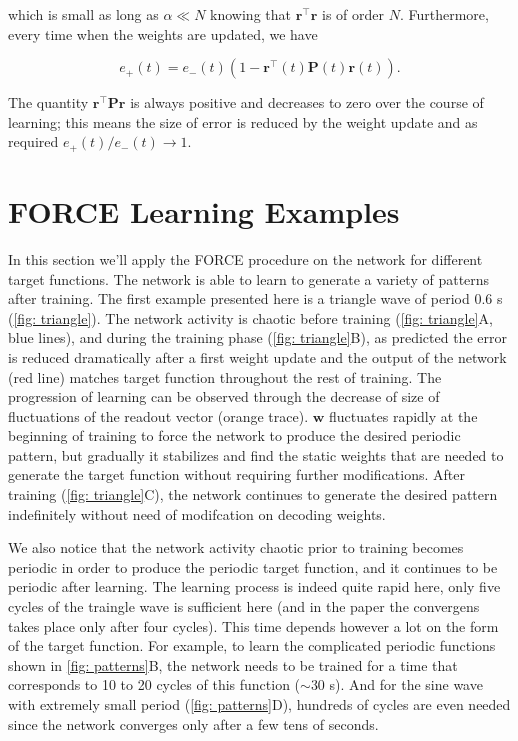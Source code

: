 \noindent
which is small as long as $\alpha \ll N$ knowing that 
$\mathbf{r}^{\top}\mathbf{r}$ is of order $N$. Furthermore, every time
when the weights are updated, we have

\[e_+(t) = e_-(t)(1-\mathbf{r}^{\top}(t)\mathbf{P}(t)\mathbf{r}(t)).\]

\noindent
The quantity $\mathbf{r}^{\top}\mathbf{Pr}$ is always positive and
decreases to zero over the course of learning; this means the size of 
error is reduced by the weight update and as required 
$e_+(t)/e_-(t) \rightarrow 1$.


\section{FORCE Learning Examples}

In this section we'll apply the FORCE procedure on the network for different
target functions. The network is able to learn to generate a variety of
patterns after training. The first example presented here is a 
triangle wave of period 0.6 s (\autoref{fig: triangle}). 
The network activity is chaotic before training 
(\autoref{fig: triangle}A, blue lines), and 
during the training phase (\autoref{fig: triangle}B), 
as predicted the error is reduced dramatically after a first weight
update and the output of the network (red line)
matches target function throughout
the rest of training. The progression of learning can be observed through
the decrease of size of fluctuations of the readout vector
(orange trace). $\mathbf{w}$ 
fluctuates rapidly at the beginning of training to force the network
to produce the desired periodic pattern, but gradually it stabilizes and
find the static weights that are needed to generate the target function
without requiring further modifications. 
After training (\autoref{fig: triangle}C), the network continues
to generate the desired pattern indefinitely without need of modifcation 
on decoding weights.

We also notice that the network activity chaotic prior to training 
becomes periodic in order to produce the periodic target function, and
it continues to be periodic after learning. The learning process is indeed
quite rapid here, only five cycles of the traingle wave is sufficient 
here (and in the paper the convergens takes place only after four cycles).
This time depends however a lot on the form of the target function.
For example, to learn the complicated periodic functions shown in
\autoref{fig: patterns}B, the network needs to be trained for a time
that corresponds to 10 to 20 cycles of this function ($\sim 30$ s).
And for the sine wave with extremely small period (\autoref{fig: patterns}D),
hundreds of cycles are even needed since the network converges only
after a few tens of seconds.

